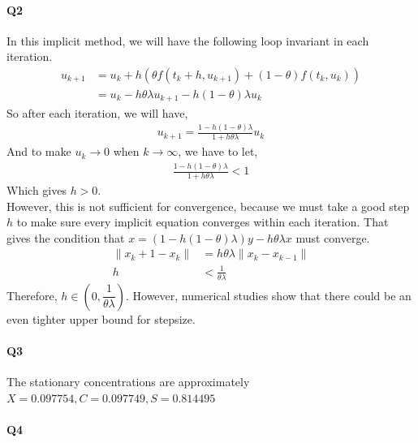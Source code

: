\documentclass[11pt]{article}
\begin{document}
\paragraph{Q2}
In this implicit method, we will have the following loop invariant in each iteration.
\begin{align}
	u_{k+1}&=u_k+h(\theta f(t_k+h,u_{k+1})+(1-\theta)f(t_k,u_k))\\
	&=u_k-h\theta\lambda u_{k+1}-h(1-\theta)\lambda u_k
\end{align}
So after each iteration, we will have,
\begin{align}
	u_{k+1}=\frac{1-h(1-\theta)\lambda}{1+h\theta\lambda}u_k
\end{align}
And to make $u_k\rightarrow0$ when $k\rightarrow\infty$, we have to let,
\begin{align}
	\frac{1-h(1-\theta)\lambda}{1+h\theta\lambda}<1
\end{align}
Which gives $h>0$.\\
However, this is not sufficient for convergence, because we must take a good step $h$ to make sure every implicit equation converges within each iteration. That gives the condition that $x=(1-h(1-\theta)\lambda)y-h\theta\lambda x$ must converge.
\begin{align}
	\|x_k+1-x_k\|&=h\theta\lambda\|x_k-x_{k-1}\|\\
	h&<\frac{1}{\theta\lambda}
\end{align} 
Therefore, $h\in (0,\dfrac{1}{\theta\lambda})$. However, numerical studies show that there could be an even tighter upper bound for stepsize.
\paragraph{Q3}
The stationary concentrations are approximately $X=0.097754, C=0.097749
,S=0.814495$
\begin{figure}[H]
	\centering
\end{figure}
\paragraph{Q4}


\end{document}
